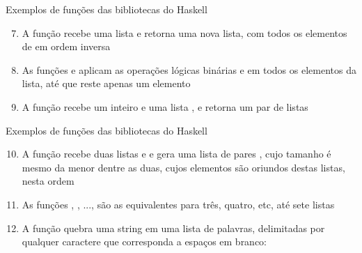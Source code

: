 \begin{frame}[fragile]{Exemplos de funções das bibliotecas do Haskell}

    \begin{enumerate}
        \setcounter{enumi}{6}

        \item A função  recebe uma lista  e retorna uma 
            nova lista, com todos os elementos de  em ordem inversa


        \item As funções  e  aplicam as operações lógicas
            binárias  e  em todos os elementos da lista,
            até que reste apenas um elemento


        \item A função  recebe um inteiro  e uma lista
            , e retorna um par de listas 
    \end{enumerate}

\end{frame}

\begin{frame}[fragile]{Exemplos de funções das bibliotecas do Haskell}

    \begin{enumerate}
        \setcounter{enumi}{9}

        \item A função  recebe duas listas  e 
             e gera uma lista de pares , cujo tamanho é mesmo
            da menor dentre as duas, cujos elementos  são oriundos destas
            listas, nesta ordem

        
        \item As funções , , ...,  são 
            as equivalentes para três, quatro, etc, até sete listas

        \item A função  quebra uma string em uma lista de palavras, delimitadas
            por qualquer caractere que corresponda a espaços em branco:

    \end{enumerate}

\end{frame}


